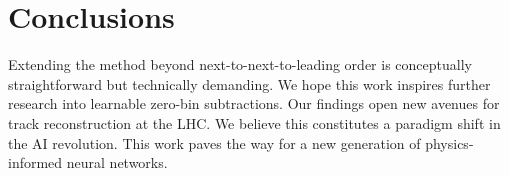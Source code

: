 \section{Conclusions}\label{sec:conclusions}

Extending the method beyond next-to-next-to-leading order is
conceptually straightforward but technically demanding. We hope this
work inspires further research into learnable zero-bin subtractions. Our
findings open new avenues for track reconstruction at the LHC. We
believe this constitutes a paradigm shift in the AI revolution. This
work paves the way for a new generation of physics-informed neural
networks.

